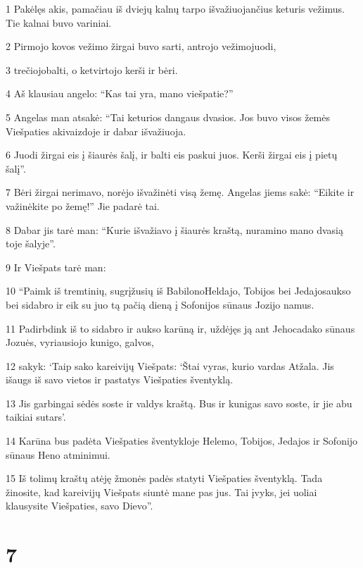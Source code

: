 \par 1 Pakėlęs akis, pamačiau iš dviejų kalnų tarpo išvažiuojančius keturis vežimus. Tie kalnai buvo variniai. 
\par 2 Pirmojo kovos vežimo žirgai buvo sarti, antrojo vežimo­juodi, 
\par 3 trečiojo­balti, o ketvirtojo­ kerši ir bėri. 
\par 4 Aš klausiau angelo: “Kas tai yra, mano viešpatie?” 
\par 5 Angelas man atsakė: “Tai keturios dangaus dvasios. Jos buvo visos žemės Viešpaties akivaizdoje ir dabar išvažiuoja. 
\par 6 Juodi žirgai eis į šiaurės šalį, ir balti eis paskui juos. Kerši žirgai eis į pietų šalį”. 
\par 7 Bėri žirgai nerimavo, norėjo išvažinėti visą žemę. Angelas jiems sakė: “Eikite ir važinėkite po žemę!” Jie padarė tai. 
\par 8 Dabar jis tarė man: “Kurie išvažiavo į šiaurės kraštą, nuramino mano dvasią toje šalyje”. 
\par 9 Ir Viešpats tarė man: 
\par 10 “Paimk iš tremtinių, sugrįžusių iš Babilono­Heldajo, Tobijos bei Jedajos­aukso bei sidabro ir eik su juo tą pačią dieną į Sofonijos sūnaus Jozijo namus. 
\par 11 Padirbdink iš to sidabro ir aukso karūną ir, uždėjęs ją ant Jehocadako sūnaus Jozuės, vyriausiojo kunigo, galvos, 
\par 12 sakyk: ‘Taip sako kareivijų Viešpats: ‘Štai vyras, kurio vardas Atžala. Jis išaugs iš savo vietos ir pastatys Viešpaties šventyklą. 
\par 13 Jis garbingai sėdės soste ir valdys kraštą. Bus ir kunigas savo soste, ir jie abu taikiai sutars’. 
\par 14 Karūna bus padėta Viešpaties šventykloje Helemo, Tobijos, Jedajos ir Sofonijo sūnaus Heno atminimui. 
\par 15 Iš tolimų kraštų atėję žmonės padės statyti Viešpaties šventyklą. Tada žinosite, kad kareivijų Viešpats siuntė mane pas jus. Tai įvyks, jei uoliai klausysite Viešpaties, savo Dievo”.



\chapter{7}


